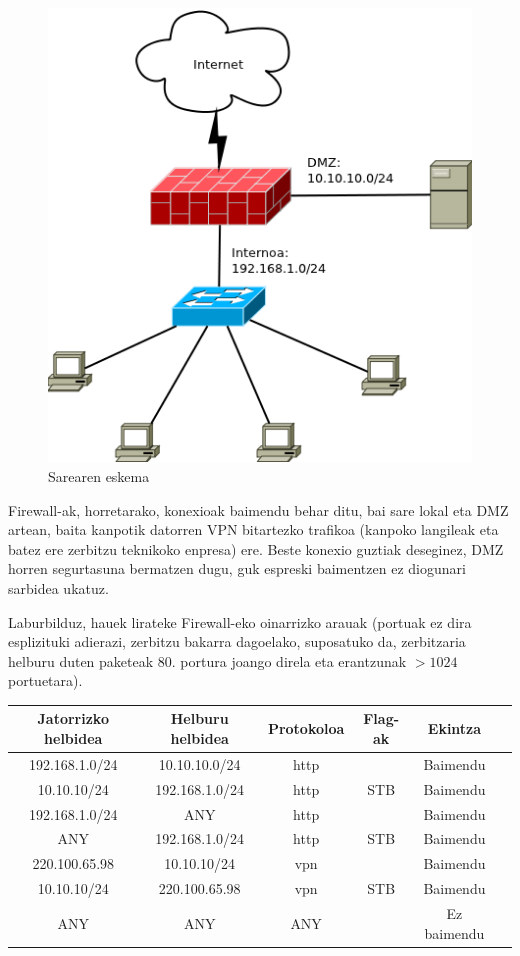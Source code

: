 \begin{figure}
\centering
   \includegraphics[scale=0.5]{irudiak/sarea.png}
   \caption{Sarearen eskema}
   \label{fig:sarea}
\end{figure}

Firewall-ak, horretarako, konexioak baimendu behar ditu, bai sare lokal eta DMZ artean, baita kanpotik datorren VPN bitartezko trafikoa (kanpoko langileak eta batez ere zerbitzu teknikoko enpresa) ere. Beste konexio guztiak deseginez, DMZ horren segurtasuna bermatzen dugu, guk espreski baimentzen ez diogunari sarbidea ukatuz.

Laburbilduz, hauek lirateke Firewall-eko oinarrizko arauak (portuak ez dira esplizituki adierazi, zerbitzu bakarra dagoelako, suposatuko da, zerbitzaria helburu duten paketeak 80. portura joango direla eta erantzunak $>1024$ portuetara).
\bigskip


\begin{tabular}{|c|c|c|c|c|c|}
\hline
 Jatorrizko helbidea & Helburu helbidea & Protokoloa & Flag-ak & Ekintza \\ \hline
 192.168.1.0/24 & 10.10.10.0/24 & http &  & Baimendu \\ \hline 
 10.10.10/24 & 192.168.1.0/24 & http & STB & Baimendu \\ \hline
 192.168.1.0/24 & ANY & http &  & Baimendu \\ \hline
 ANY & 192.168.1.0/24 & http & STB & Baimendu \\ \hline
 220.100.65.98 & 10.10.10/24 & vpn & & Baimendu \\ \hline
 10.10.10/24 & 220.100.65.98 & vpn & STB & Baimendu \\ \hline
 ANY & ANY & ANY & & Ez baimendu \\ \hline
\end{tabular}

